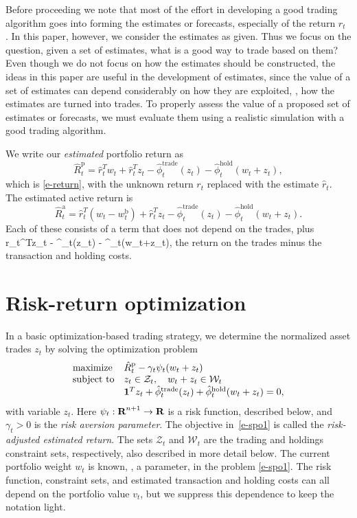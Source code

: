 \documentclass[openany]{now}
\newcommand{\trcosthat}{\hat \phi^\mathrm{trade}}
\newcommand{\hldcosthat}{\hat \phi^\mathrm{hold}}
\newcommand{\Rphat}{\hat R^\mathrm{p}}
\newcommand{\Rahat}{\hat R^\mathrm{a}}
\newcommand{\wb}{w^\mathrm{b}}
\begin{document}
Before proceeding we note that most of the effort in developing a
good trading algorithm goes
into forming the estimates or forecasts, especially of the return $r_t$
\cite{campbell1997econometrics,grinold1999active}.  In this paper, however, we consider
the estimates as given.  Thus we focus on the question, given a set
of estimates, what is a good way to trade based on them?
Even though we do not focus on how the estimates should be constructed,
the ideas in this paper are useful in the development of estimates, since
the value of a set of estimates can depend considerably on how they
are exploited, \ie, how the estimates are turned into trades.
To properly assess the value of a proposed set of estimates or forecasts,
we must evaluate them using a realistic simulation with a good
trading algorithm.

We write our \emph{estimated} portfolio return as
\[
\Rphat _t %
= \hat r_t^T w_t + \hat r_t^Tz_t - \trcosthat_t(z_t) - \hldcosthat_t(w_t+z_t),
\]
which is \eqref{e-return}, with the unknown return $r_t$
replaced with the estimate $\hat r_t$.
The estimated active return is
\[
\Rahat _t =
\hat r_t^T (w_t-\wb_t) + \hat r_t^Tz_t - \trcosthat_t(z_t) - \hldcosthat_t(w_t+z_t).
\]
Each of these consists of a term that does not depend on the trades, plus
\BEQ\label{e-comm-obj}
\hat r_t^Tz_t - \trcosthat_t(z_t) - \hldcosthat_t(w_t+z_t),
\EEQ
the return on the trades minus the transaction and holding costs.

\section{Risk-return optimization}
In a basic optimization-based trading strategy,
we determine the normalized asset trades $z_t$ by solving the
optimization problem
\begin{equation}\label{e-spo1}
\begin{array}{ll}
\mbox{maximize} &
\Rphat_t - \gamma_t \psi_t(w_t+z_t) \\
\mbox{subject to} &
z_t \in \mathcal Z_t, \quad
w_t + z_t \in \mathcal W_t \\
& \ones^Tz_t + \trcosthat_t (z_t) + \hldcosthat_t (w_t + z_t) = 0,
\end{array}
\end{equation}
with variable $z_t$.
Here $\psi_t: {\mbox{\bf R}}^{n+1} \to {\mbox{\bf R}}$ is a risk function,
described below, and $\gamma_t >0$ is the \emph{risk aversion parameter}.
The objective in~\eqref{e-spo1} is called the \emph{risk-adjusted estimated return}.
The sets $\mathcal Z_t$ and $\mathcal W_t$
are the trading and holdings constraint sets, respectively,
also described in more detail below.
The current portfolio weight $w_t$ is known, \ie, a parameter, in the problem
\eqref{e-spo1}.
The risk function, constraint sets, and estimated transaction and holding costs
can all depend on the portfolio value $v_t$, but we suppress this dependence
to keep the notation light.
\end{document}
